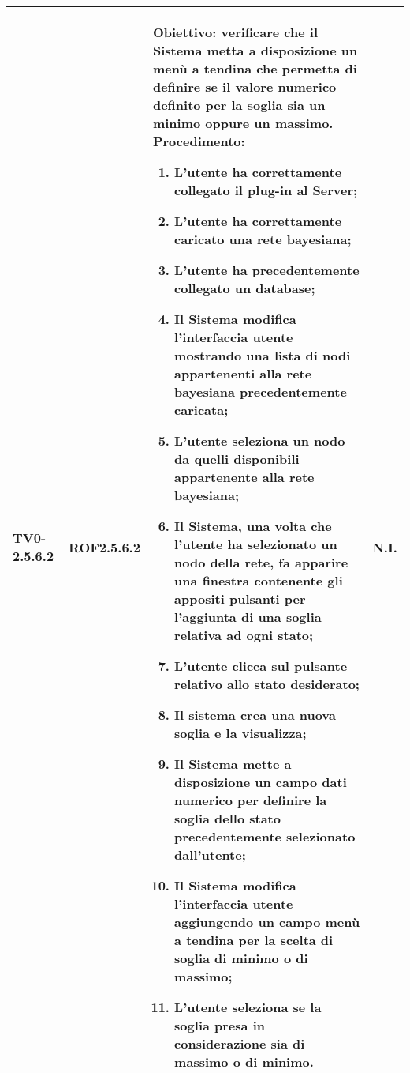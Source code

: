 \begin{longtable}{|C{.15\textwidth}|C{.13\textwidth}|m{.52\textwidth}|C{.08\textwidth}|}
TV0-2.5.6.2 & ROF2.5.6.2 &
	\textbf{Obiettivo}: verificare che il Sistema metta a disposizione un menù a tendina che permetta di definire se il valore numerico definito per la soglia sia un minimo oppure un massimo. \newline
	\textbf{Procedimento}:
	\begin{enumerate}
		\item L'utente ha correttamente collegato il plug-in al Server;
		\item L'utente ha correttamente caricato una rete bayesiana;
		\item L'utente ha precedentemente collegato un database;
		\item Il Sistema modifica l'interfaccia utente mostrando una lista di nodi appartenenti alla rete bayesiana precedentemente caricata;
		\item L'utente seleziona un nodo da quelli disponibili appartenente alla rete bayesiana;
		\item Il Sistema, una volta che l'utente ha selezionato un nodo della rete, fa apparire una finestra contenente gli appositi pulsanti per l'aggiunta di una soglia relativa ad ogni stato;
		\item L'utente clicca sul pulsante relativo allo stato desiderato;
		\item Il sistema crea una nuova soglia e la visualizza;
		\item Il Sistema mette a disposizione un campo dati numerico per definire la soglia dello stato precedentemente selezionato dall'utente;
		\item Il Sistema modifica l'interfaccia utente aggiungendo un campo menù a tendina per la scelta di soglia di minimo o di massimo;
		\item L'utente seleziona se la soglia presa in considerazione sia di massimo o di minimo.
	\end{enumerate}
	& N.I. \\
\hline


\end{longtable}
